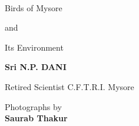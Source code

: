 ~\phantom{a}
\vfill

\thispagestyle{empty}

\begin{center}
{\Huge Birds of Mysore}\relax

\bigskip
{\Huge and}\relax

\smallskip
\bigskip
{\Huge Its Environment}\relax
\end{center}

\vfill

\begin{center}
{\bf Sri N.P. DANI}

\smallskip
{Retired Scientist C.F.T.R.I. Mysore}
\bigskip 

Photographs by\\
{\bf Saurab Thakur}

\end{center}
\newpage


 
